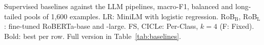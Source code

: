 \begin{table}[t]
  \centering
  \footnotesize
  \setlength{\tabcolsep}{3pt}
  
  \caption{Supervised baselines against the LLM pipelines, macro-F1, balanced and long-tailed pools of 1,600 examples. LR: MiniLM with logistic regression. RoB$_{\mathrm{B}}$, RoB$_{\mathrm{L}}$: fine-tuned RoBERTa-base and -large. FS, CICLe: Per-Class, $k = 4$ (F: Fixed). Bold: best per row. Full version in Table~\ref{tab:baselines}.} %
  \label{tab:main_supervised}
\end{table}
